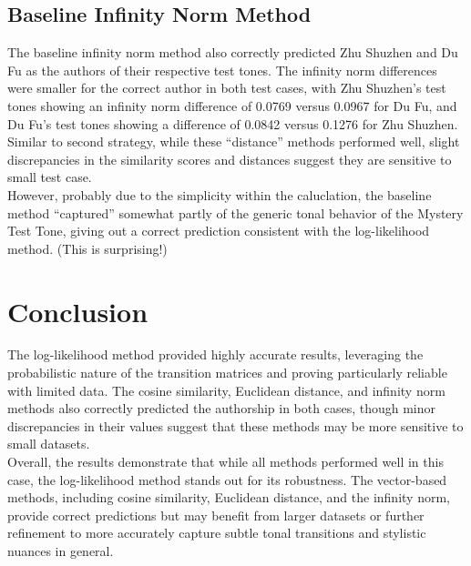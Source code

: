\documentclass[12pt]{article}
\begin{document}
\subsection*{Baseline Infinity Norm Method}
The baseline infinity norm method also correctly predicted Zhu Shuzhen and Du Fu as the authors of their respective test tones. The infinity norm differences were smaller for the correct author in both test cases, with Zhu Shuzhen's test tones showing an infinity norm difference of 0.0769 versus 0.0967 for Du Fu, and Du Fu's test tones showing a difference of 0.0842 versus 0.1276 for Zhu Shuzhen.
\\
Similar to second strategy, while these ``distance'' methods performed well, slight discrepancies in the similarity scores and distances suggest they are sensitive to small test case.
\\
However, probably due to the simplicity within the caluclation, the baseline method ``captured'' somewhat partly of the generic tonal behavior of the Mystery Test Tone, giving out a correct prediction consistent with the log-likelihood method. (This is surprising!) 

\section{Conclusion}
The log-likelihood method provided highly accurate results, leveraging the probabilistic nature of the transition matrices and proving particularly reliable with limited data. The cosine similarity, Euclidean distance, and infinity norm methods also correctly predicted the authorship in both cases, though minor discrepancies in their values suggest that these methods may be more sensitive to small datasets.
\\
Overall, the results demonstrate that while all methods performed well in this case, the log-likelihood method stands out for its robustness. The vector-based methods, including cosine similarity, Euclidean distance, and the infinity norm, provide correct predictions but may benefit from larger datasets or further refinement to more accurately capture subtle tonal transitions and stylistic nuances in general.
\end{document}
